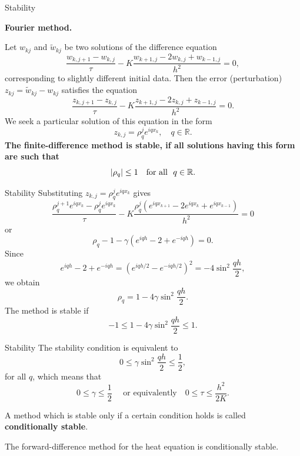 \documentclass{beamer}
\begin{document}

\begin{frame}{Stability}

{\small

\textbf{Fourier method.}


Let $w_{kj}$  and $\tilde{w}_{kj}$ be two solutions of the difference equation
\[
\frac{w_{k,j+1}-w_{k,j}}{\tau}-K\frac{w_{k+1,j}-2w_{k,j}+w_{k-1,j}}{h^2}=0,
\]
corresponding to slightly different initial data.
Then the error (perturbation) $z_{kj}=\tilde{w}_{kj}-w_{kj}$ satisfies the equation
\[
\frac{z_{k,j+1}-z_{k,j}}{\tau}-K\frac{z_{k+1,j}-2z_{k,j}+z_{k-1,j}}{h^2}=0.
\]
We seek a particular solution of this equation in the form
\[
z_{k,j}=\rho_{q}^{j}e^{iqx_{k}}, \quad q\in{\mathbb R}.
\]
\textbf{The finite-difference method
is stable, if all solutions having this form are such that}
\[
\vert\rho_{q}\vert\leq 1 \quad {\rm for \ all} \ \ q\in{\mathbb R}.
\]
}

\end{frame}


\begin{frame}{Stability}
Substituting $z_{k,j}=\rho_{q}^{j}e^{iqx_{k}}$ gives
\[
\frac{\rho_{q}^{j+1}e^{iqx_{k}}-\rho_{q}^{j}e^{iqx_{k}}}{\tau}-
K\frac{\rho_{q}^{j}\left(e^{iqx_{k+1}}-2e^{iqx_{k}}+e^{iqx_{k-1}}\right)}{h^2}=0
\]
or
\[
\rho_{q}-1 - \gamma \left(e^{iqh}-2+e^{-iqh}\right)=0.
\]
Since
\[
e^{iqh}-2+e^{-iqh}=\left(e^{iqh/2}-e^{-iqh/2}\right)^{2}=-4\sin^{2}
\frac{qh}{2},
\]
we obtain
\[
\rho_{q}=1-4\gamma\sin^{2} \frac{qh}{2}.
\]
The method is stable if
\[
-1\leq 1-4\gamma\sin^{2}\frac{qh}{2}\leq 1 .
\]



\end{frame}


\begin{frame}{Stability}
The stability condition is equivalent to
\[
0\leq \gamma\sin^{2}\frac{qh}{2}\leq \frac{1}{2},
\]
for all $q$, which means that
\[
0\leq\gamma \leq \frac{1}{2} \quad \text{ or equivalently} \quad0\leq \tau \leq
\frac{h^2}{2K}. 
\]

\vskip 3mm   A method which is stable only if a certain
condition holds is called {\bf conditionally stable}. 

The
forward-difference method for the heat equation is conditionally
stable.

\end{frame}
\end{document}
